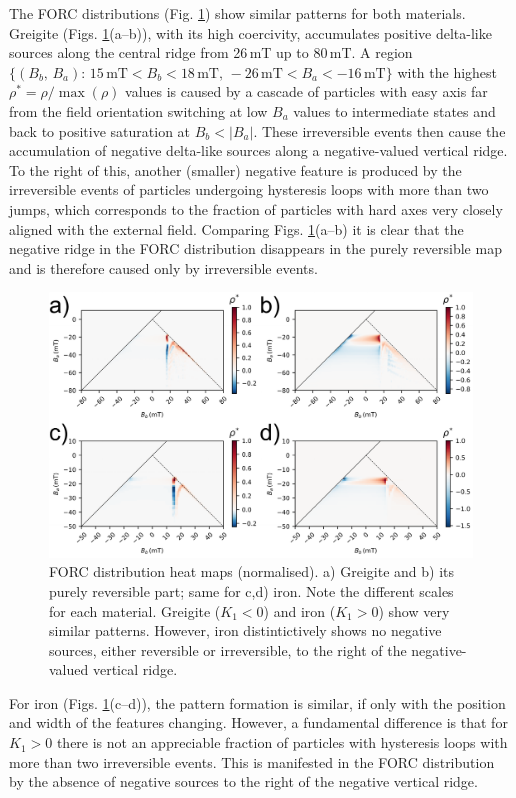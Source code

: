 The FORC distributions (Fig. \ref{FIG03}) show similar patterns for both materials. Greigite (Figs. \ref{FIG03}(a--b)), with its high coercivity, accumulates positive delta-like sources along the central ridge from 26$\,$mT up to 80$\,$mT. A region $\{(B_b,\,B_a):\,15\,\text{mT}< B_b < 18\,\text{mT},\, -26\,\text{mT}< B_a < -16\,\text{mT}\}$ with the highest $\rho^{*}=\rho/\max (\rho)$ values is caused by a cascade of particles with easy axis far from the field orientation switching at low $B_a$ values to intermediate states and back to positive saturation at $B_b < |B_a|$. These irreversible events then cause the accumulation of negative delta-like sources along a negative-valued vertical ridge. To the right of this, another (smaller) negative feature is produced by the irreversible events of particles undergoing hysteresis loops with more than two jumps, which corresponds to the fraction of particles with hard axes very closely aligned with the external field. Comparing Figs. \ref{FIG03}(a--b) it is clear that the negative ridge in the FORC distribution disappears in the purely reversible map and is therefore caused only by irreversible events.
\begin{figure}
\includegraphics[width=\textwidth]{research-2/figs/FIG03.pdf}
\caption[FORC distribution heat maps (dipolar model)]{FORC distribution heat maps (normalised). a) Greigite and b) its purely reversible part; same for c,d) iron. Note the different scales for each material. Greigite ($K_1 < 0$) and iron ($K_1>0$) show very similar patterns. However, iron distintictively shows no negative sources, either reversible or irreversible, to the right of the negative-valued vertical ridge.}
\label{FIG03}
\end{figure}
\par
For iron (Figs. \ref{FIG03}(c--d)), the pattern formation is similar, if only with the position and width of the features changing. However, a fundamental difference is that for $K_1>0$ there is not an appreciable fraction of particles with hysteresis loops with more than two irreversible events. This is manifested in the FORC distribution by the absence of negative sources to the right of the negative vertical ridge.\par

